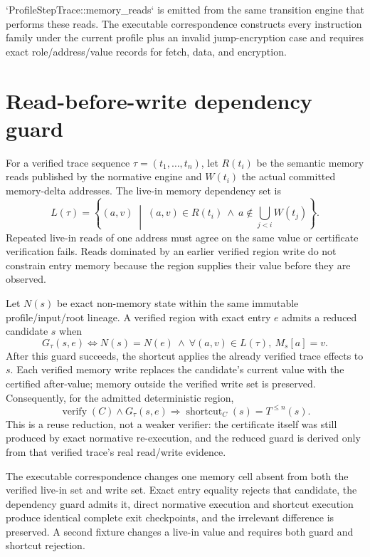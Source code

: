 \documentclass{article}
\begin{document}
`ProfileStepTrace::memory\_reads` is emitted from the same transition engine that
performs these reads. The executable correspondence constructs every instruction
family under the current profile plus an invalid jump-encryption case and requires
exact role/address/value records for fetch, data, and encryption.

\section{Read-before-write dependency guard}

For a verified trace sequence $\tau=(t_1,\ldots,t_n)$, let $R(t_i)$ be the
semantic memory reads published by the normative engine and $W(t_i)$ the actual
committed memory-delta addresses. The live-in memory dependency set is
\begin{equation}
  L(\tau)=\left\{(a,v)\;\middle|\;
    (a,v)\in R(t_i)\ \land\
    a\notin\bigcup_{j<i}W(t_j)
  \right\}.
  \label{eq:state-graph-region-live-in}
\end{equation}
Repeated live-in reads of one address must agree on the same value or certificate
verification fails. Reads dominated by an earlier verified region write do not
constrain entry memory because the region supplies their value before they are
observed.

Let $N(s)$ be exact non-memory state within the same immutable profile/input/root
lineage. A verified region with exact entry $e$ admits a reduced candidate $s$
when
\begin{equation}
  G_{\tau}(s,e)
  \Longleftrightarrow
  N(s)=N(e)\ \land\
  \forall(a,v)\in L(\tau),\ M_s[a]=v.
  \label{eq:state-graph-region-dependency-guard}
\end{equation}
After this guard succeeds, the shortcut applies the already verified trace effects
to $s$. Each verified memory write replaces the candidate's current value with
the certified after-value; memory outside the verified write set is preserved.
Consequently, for the admitted deterministic region,
\[
  \operatorname{verify}(C)\land G_{\tau}(s,e)
  \Longrightarrow
  \operatorname{shortcut}_C(s)=T^{\leq n}(s).
\]
This is a reuse reduction, not a weaker verifier: the certificate itself was
still produced by exact normative re-execution, and the reduced guard is derived
only from that verified trace's real read/write evidence.

The executable correspondence changes one memory cell absent from both the
verified live-in set and write set. Exact entry equality rejects that candidate,
the dependency guard admits it, direct normative execution and shortcut execution
produce identical complete exit checkpoints, and the irrelevant difference is
preserved. A second fixture changes a live-in value and requires both guard and
shortcut rejection.
\end{document}
